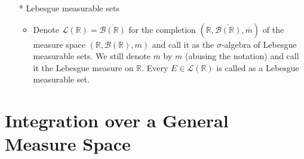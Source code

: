 \documentclass[12pt]{article}
\newcommand{\R}{\mathbb{R}}
\newcommand{\LL}{\mathcal{L}}
\newcommand{\Borel}{\mathcal{B}(\mathbb{R})}
\begin{document}
\begin{itemize}
\begin{itemize}
    \end{itemize}
    \item[*] Lebesgue measurable sets
    \begin{itemize}
        \item Denote $\LL(\R)=\overline{\Borel}$ for the completion $(\R, \overline{\Borel}, \overline{m})$ of the measure space $(\R,\Borel, m)$ and call it as the $\sigma$-algebra of Lebesgue measurable sets. We still denote $\overline{m}$ by $m$ (abusing the notation) and call it the Lebesgue measure on $\R$. Every $E\in \LL(\R)$ is called as a Lebesgue measurable set.
    \end{itemize}
\end{itemize}
\clearpage

\section{Integration over a General Measure Space}
\smallskip
\end{document}

